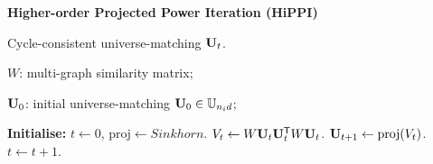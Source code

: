 \begin{algorithm*}
\caption{\textbf{Higher-order Projected Power Iteration (HiPPI)~\cite{bernard2019hippi}}}
    \renewcommand{\algorithmicrequire}{\textbf{Input:}}     \renewcommand{\algorithmicensure}{\textbf{Output:}}
    
    \begin{algorithmic}[1]
        \ENSURE 
        Cycle-consistent universe-matching $\bold{U}_t$.
        

        \REQUIRE 
        $W$: multi-graph similarity matrix;

        $\bold{U}_0$: initial universe-matching $\bold{U}_0 \in \mathbb{U}_{n_id}$;

        \STATE \textbf{Initialise:} $t\leftarrow 0$, $\text{proj} \leftarrow Sinkhorn$.
        \REPEAT
        \STATE \hspace{1em} $V_t \leftarrow W \bold{U}_t \bold{U}_t^{\mathsf{T}} W \bold{U}_t$.
        \STATE \hspace{1em} $\bold{U}_{t+1} \leftarrow \text{proj}(V_t)$.
        \STATE \hspace{1em} $t\leftarrow t+1$.
    \end{algorithmic}
\label{algo:hippi}
\end{algorithm*}

